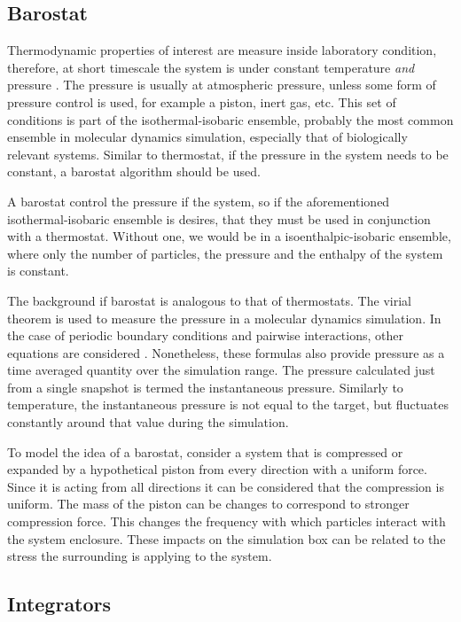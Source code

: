 \subsection{Barostat}

Thermodynamic properties of interest are measure inside laboratory condition, therefore, at short timescale the system is under constant temperature \emph{and} pressure \cite{tuckerman2010statistical}. The pressure is usually at atmospheric pressure, unless some form of pressure control is used, for example a piston, inert gas, etc. This set of conditions is part of the isothermal-isobaric ensemble, probably the most common ensemble in molecular dynamics simulation, especially that of biologically relevant systems. Similar to thermostat, if the pressure in the system needs to be constant, a barostat algorithm should be used.

A barostat control the pressure if the system, so if the aforementioned isothermal-isobaric ensemble is desires, that they must be used in conjunction with a thermostat. Without one, we would be in a isoenthalpic-isobaric ensemble, where only the number of particles, the pressure and the enthalpy  of the system is constant.

The background if barostat is analogous to that of thermostats. The virial theorem is used to measure the pressure in a molecular dynamics simulation. In the case of periodic boundary conditions and pairwise interactions, other equations are considered \cite{allen2017computer}. Nonetheless, these formulas also provide pressure as a time averaged quantity over the simulation range. The pressure calculated just from a single snapshot is termed the instantaneous pressure. Similarly to temperature, the instantaneous pressure is not equal to the target, but fluctuates constantly around that value during the simulation.

To model the idea of a barostat, consider a system that is compressed or expanded by a hypothetical piston from every direction with a uniform force. Since it is acting from all directions it can be considered that the compression is uniform. The mass of the piston can be changes to correspond to stronger compression force. This changes the frequency with which particles interact with the system enclosure. These impacts on the simulation box can be related to the stress the surrounding is applying to the system.

\subsection{Integrators}

